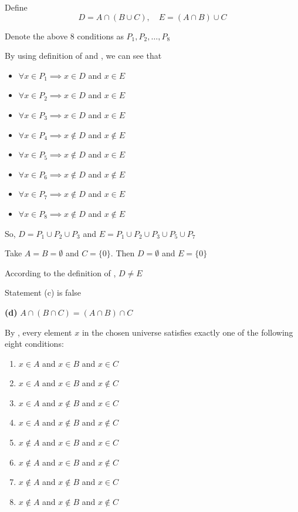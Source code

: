 \documentclass[12pt]{article}
\begin{document}
Define 
\[D= A \cap (B \cup C), \quad E = (A \cap B) \cup C\] 

Denote the above 8 conditions as $P_1, P_2, \ldots, P_8$

By using definition of  and , we can see that 
\begin{itemize}[nosep]
\item $\forall x \in P_1 \implies x \in D$ and $x \in E$
\item $\forall x \in P_2 \implies x \in D$ and $x \in E$
\item $\forall x \in P_3 \implies x \in D$ and $x \in E$
\item $\forall x \in P_4 \implies x \notin D$ and $x \notin E$
\item $\forall x \in P_5 \implies x \notin D$ and $x \in E$
\item $\forall x \in P_6 \implies x \notin D$ and $x \notin E$
\item $\forall x \in P_7 \implies x \notin D$ and $x \in E$
\item $\forall x \in P_8 \implies x \notin D$ and $x \notin E$
\end{itemize}

So, $D = P_1 \cup P_2 \cup P_3$ and $E = P_1 \cup P_2 \cup P_3 \cup P_5 \cup P_7$

Take \(A=B=\emptyset\) and \(C=\{0\}\). Then \(D=\emptyset\) and
\(E=\{0\}\)

According to the definition of , $D \neq E$

Statement (c) is false

\medskip
\noindent\textbf{(d)} $A \cap (B \cap C) = (A \cap B) \cap C$

By , every element \(x\) in the chosen
universe satisfies exactly one of the following eight conditions:
\begin{enumerate}[nosep] 
\item $x \in A$ and $x \in B$ and $x \in C$
\item $x \in A$ and $x \in B$ and $x \notin C$
\item $x \in A$ and $x \notin B$ and $x \in C$
\item $x \in A$ and $x \notin B$ and $x \notin C$
\item $x \notin A$ and $x \in B$ and $x \in C$
\item $x \notin A$ and $x \in B$ and $x \notin C$
\item $x \notin A$ and $x \notin B$ and $x \in C$
\item $x \notin A$ and $x \notin B$ and $x \notin C$
\end{enumerate} 
\end{document}

